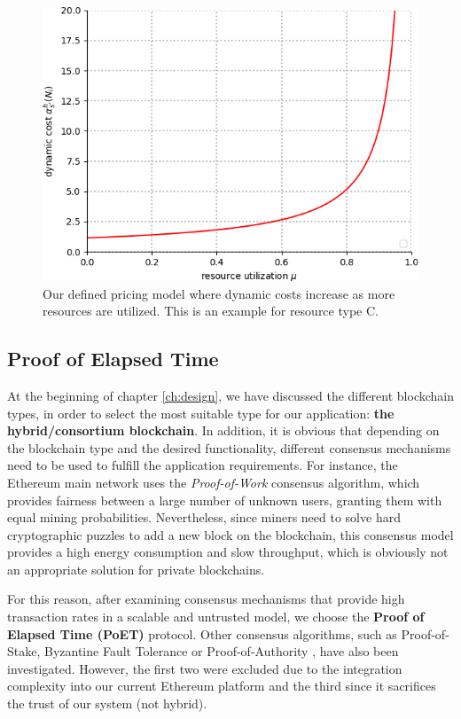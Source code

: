 \begin{figure}[bth]
	\centering
	\includegraphics[scale=0.66]{gfx/pricing_model.png}    
  	\caption{Our defined pricing model where dynamic costs increase as more resources are utilized. This is an example for resource type C.}
  	\label{fig:pricing_model}
\end{figure}

\subsection{Proof of Elapsed Time} \label{poet}

At the beginning of chapter \ref{ch:design}, we have discussed the different blockchain types, in order to select the most suitable type for our application: \textbf{the hybrid/consortium blockchain}. In addition, it is obvious that depending on the blockchain type and the desired functionality, different consensus mechanisms need to be used to fulfill the application requirements. For instance, the Ethereum main network uses the \textit{Proof-of-Work} consensus algorithm, which provides fairness between a large number of unknown users, granting them with equal mining probabilities. Nevertheless, since miners need to solve hard cryptographic puzzles to add a new block on the blockchain, this consensus model provides a high energy consumption and slow throughput, which is obviously not an appropriate solution for private blockchains.

For this reason, after examining consensus mechanisms that provide high transaction rates in a scalable and untrusted model, we choose the \textbf{Proof of Elapsed Time (PoET)} protocol. Other consensus algorithms, such as Proof-of-Stake, Byzantine Fault Tolerance or Proof-of-Authority \citep{baliga2017understanding}, have also been investigated. However, the first two were excluded due to the integration complexity into our current Ethereum platform and the third since it sacrifices the trust of our system (not hybrid).

